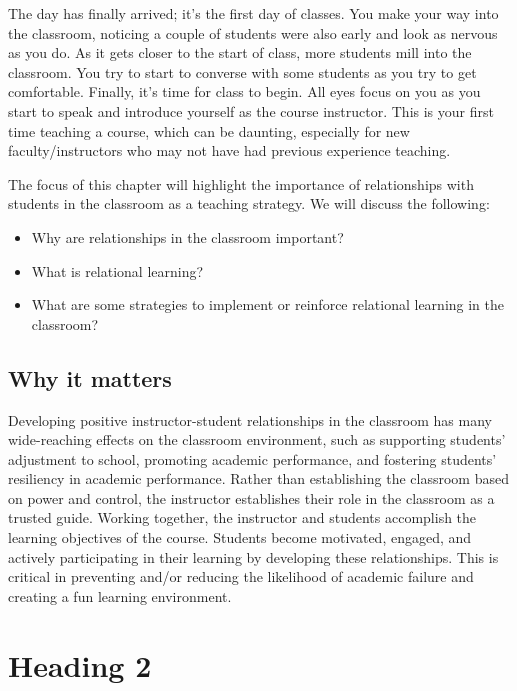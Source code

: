\documentclass{book}
\begin{document}
The day has finally arrived; it's the first day of classes. You make your way
into the classroom, noticing a couple of students were also early and look as
nervous as you do. As it gets closer to the start of class, more students mill
into the classroom. You try to start to converse with some students as you try
to get comfortable. Finally, it's time for class to begin. All eyes focus on
you as you start to speak and introduce yourself as the course instructor.
This is your first time teaching a course, which can be daunting, especially
for new faculty/instructors who may not have had previous experience
teaching.~

The focus of this chapter will highlight the importance of relationships with
students in the classroom as a teaching strategy. We will discuss the
following:

\begin{itemize}
\item
  Why are relationships in the classroom important?
\item
  What is relational learning?
\item
  What are some strategies to implement or reinforce relational learning in
  the classroom?
\end{itemize}

\hypertarget{why-it-matters}{%
\subsection{Why it matters}\label{why-it-matters}}

Developing positive instructor-student relationships in the classroom has many
wide-reaching effects on the classroom environment, such as supporting
students' adjustment to school, promoting academic performance, and fostering
students' resiliency in academic performance. Rather than establishing the
classroom based on power and control, the instructor establishes their role in
the classroom as a trusted guide. Working together, the instructor and
students accomplish the learning objectives of the course. Students become
motivated, engaged, and actively participating in their learning by developing
these relationships. This is critical in preventing and/or reducing the
likelihood of academic failure and creating a fun learning environment.

\hypertarget{heading-2}{%
\section{Heading 2}\label{heading-2}}
\end{document}
